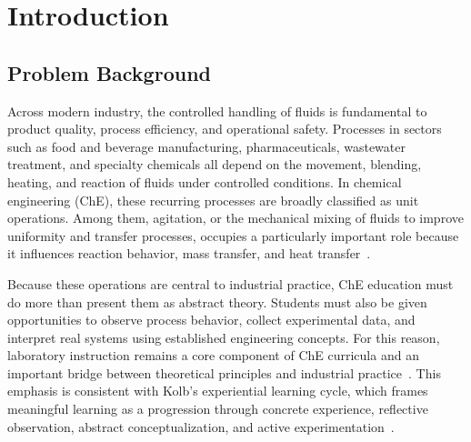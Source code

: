 
\chapter{Introduction}  %
\label{ch:introduction}

\ifpdf
    \graphicspath{{Chapter1/Figs/Raster/}{Chapter1/Figs/PDF/}{Chapter1/Figs/}}
\else
    \graphicspath{{Chapter1/Figs/Vector/}{Chapter1/Figs/}}
\fi


\section{Problem Background} %
\label{sec:background}

Across modern industry, the controlled handling of fluids is fundamental to product quality, process efficiency, and operational safety. Processes in sectors such as food and beverage manufacturing, pharmaceuticals, wastewater treatment, and specialty chemicals all depend on the movement, blending, heating, and reaction of fluids under controlled conditions. In chemical engineering (ChE), these recurring processes are broadly classified as unit operations. Among them, agitation, or the mechanical mixing of fluids to improve uniformity and transfer processes, occupies a particularly important role because it influences reaction behavior, mass transfer, and heat transfer~\citep{paul2004,harnby2000}.

Because these operations are central to industrial practice, ChE education must do more than present them as abstract theory. Students must also be given opportunities to observe process behavior, collect experimental data, and interpret real systems using established engineering concepts. For this reason, laboratory instruction remains a core component of ChE curricula and an important bridge between theoretical principles and industrial practice~\citep{feisel2005}. This emphasis is consistent with Kolb's experiential learning cycle, which frames meaningful learning as a progression through concrete experience, reflective observation, abstract conceptualization, and active experimentation~\citep{kolb1984}.


